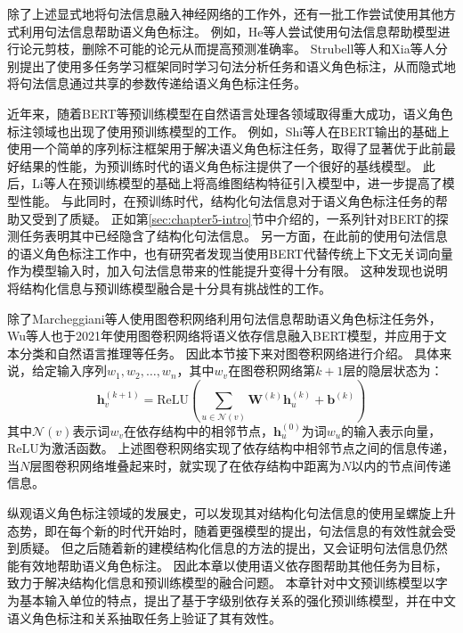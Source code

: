 除了上述显式地将句法信息融入神经网络的工作外，还有一批工作尝试使用其他方式利用句法信息帮助语义角色标注。
例如，He等人\cite{he-etal-2018-syntax,he-etal-2019-syntax}尝试使用句法信息帮助模型进行论元剪枝，删除不可能的论元从而提高预测准确率。
Strubell等人\cite{strubell-etal-2018-linguistically}和Xia等人\cite{xia-etal-2019-syntax}分别提出了使用多任务学习框架同时学习句法分析任务和语义角色标注，从而隐式地将句法信息通过共享的参数传递给语义角色标注任务。

近年来，随着BERT等预训练模型在自然语言处理各领域取得重大成功，语义角色标注领域也出现了使用预训练模型的工作。
例如，Shi等人\cite{shi-lin-2019-simple}在BERT输出的基础上使用一个简单的序列标注框架用于解决语义角色标注任务，取得了显著优于此前最好结果的性能，为预训练时代的语义角色标注提供了一个很好的基线模型。
此后，Li等人\cite{li-etal-2020-high}在预训练模型的基础上将高维图结构特征引入模型中，进一步提高了模型性能。
与此同时，在预训练时代，结构化句法信息对于语义角色标注任务的帮助又受到了质疑。
正如第\ref{sec:chapter5-intro}节中介绍的，一系列针对BERT的探测任务表明其中已经隐含了结构化句法信息。
另一方面，在此前的使用句法信息的语义角色标注工作中，也有研究者发现当使用BERT代替传统上下文无关词向量作为模型输入时，加入句法信息带来的性能提升变得十分有限\cite{xia-etal-2019-syntax}。
这种发现也说明将结构化信息与预训练模型融合是十分具有挑战性的工作。

除了Marcheggiani等人使用图卷积网络利用句法信息帮助语义角色标注任务外，Wu等人\cite{wu-etal-2021-infusing}也于2021年使用图卷积网络将语义依存信息融入BERT模型，并应用于文本分类和自然语言推理等任务。
因此本节接下来对图卷积网络进行介绍。
具体来说，给定输入序列$w_1,w_2,\dots,w_n$，其中$w_v$在图卷积网络第$k+1$层的隐层状态为：
\begin{equation}
    \bm{h}_v^{(k+1)} = \text{ReLU}(\sum_{u\in \mathcal{N}(v)}\bm{W}^{(k)}\bm{h}_u^{(k)}+\bm{b}^{(k)})
\end{equation}
其中$\mathcal{N}(v)$表示词$w_v$在依存结构中的相邻节点，$\bm{h}_u^{(0)}$为词$w_u$的输入表示向量，ReLU为激活函数。
上述图卷积网络实现了依存结构中相邻节点之间的信息传递，当$N$层图卷积网络堆叠起来时，就实现了在依存结构中距离为$N$以内的节点间传递信息。

纵观语义角色标注领域的发展史，可以发现其对结构化句法信息的使用呈螺旋上升态势，即在每个新的时代开始时，随着更强模型的提出，句法信息的有效性就会受到质疑。
但之后随着新的建模结构化信息的方法的提出，又会证明句法信息仍然能有效地帮助语义角色标注。
因此本章以使用语义依存图帮助其他任务为目标，致力于解决结构化信息和预训练模型的融合问题。
本章针对中文预训练模型以字为基本输入单位的特点，提出了基于字级别依存关系的强化预训练模型，并在中文语义角色标注和关系抽取任务上验证了其有效性。


